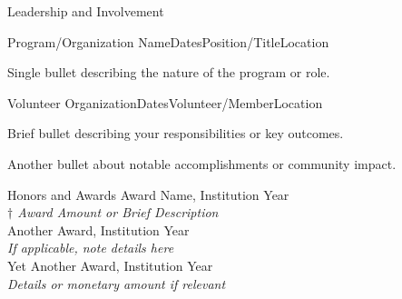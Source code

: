 \documentclass[
    11pt, %
]{resume} %
\begin{document}
\begin{rSection}{Leadership and Involvement}

\begin{rSubsection}{Program/Organization Name}{Dates}{Position/Title}{Location}\vspace{-.15em}
    \item Single bullet describing the nature of the program or role.
\end{rSubsection}
\vspace{-.5em}

\begin{rSubsection}{Volunteer Organization}{Dates}{Volunteer/Member}{Location}\vspace{-.15em}
    \item Brief bullet describing your responsibilities or key outcomes.
    \item Another bullet about notable accomplishments or community impact.
\end{rSubsection}

\end{rSection}
\vspace{-.75em}

\begin{rSection}{Honors and Awards}
Award Name, Institution \hfill Year\\
\textit{\(\dagger\) Award Amount or Brief Description} \vspace{.25em}\\

Another Award, Institution \hfill Year\\
\textit{If applicable, note details here} \vspace{.25em}\\

Yet Another Award, Institution \hfill Year\\
\textit{Details or monetary amount if relevant} \\

\end{rSection}
\vspace{-.5em}
\end{document}
